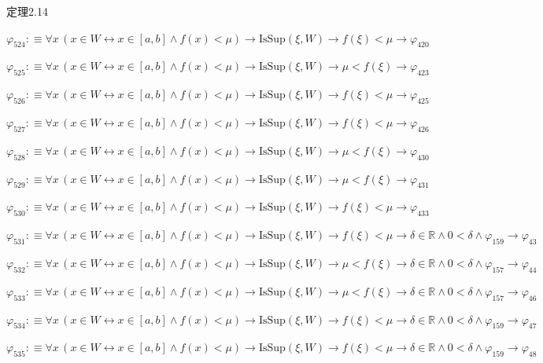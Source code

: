 \begin{fullproof}{定理2.14}
\begin{abbrevlist}
\item $\varphi_{524} :\equiv \forall x\,(x \in W \leftrightarrow x \in [a,b] \land f(x) < \mu) \to \mathrm{IsSup}(\xi,W) \to f(\xi) < \mu \to \varphi_{420}$
\item $\varphi_{525} :\equiv \forall x\,(x \in W \leftrightarrow x \in [a,b] \land f(x) < \mu) \to \mathrm{IsSup}(\xi,W) \to \mu < f(\xi) \to \varphi_{423}$
\item $\varphi_{526} :\equiv \forall x\,(x \in W \leftrightarrow x \in [a,b] \land f(x) < \mu) \to \mathrm{IsSup}(\xi,W) \to f(\xi) < \mu \to \varphi_{425}$
\item $\varphi_{527} :\equiv \forall x\,(x \in W \leftrightarrow x \in [a,b] \land f(x) < \mu) \to \mathrm{IsSup}(\xi,W) \to f(\xi) < \mu \to \varphi_{426}$
\item $\varphi_{528} :\equiv \forall x\,(x \in W \leftrightarrow x \in [a,b] \land f(x) < \mu) \to \mathrm{IsSup}(\xi,W) \to \mu < f(\xi) \to \varphi_{430}$
\item $\varphi_{529} :\equiv \forall x\,(x \in W \leftrightarrow x \in [a,b] \land f(x) < \mu) \to \mathrm{IsSup}(\xi,W) \to \mu < f(\xi) \to \varphi_{431}$
\item $\varphi_{530} :\equiv \forall x\,(x \in W \leftrightarrow x \in [a,b] \land f(x) < \mu) \to \mathrm{IsSup}(\xi,W) \to f(\xi) < \mu \to \varphi_{433}$
\item $\varphi_{531} :\equiv \forall x\,(x \in W \leftrightarrow x \in [a,b] \land f(x) < \mu) \to \mathrm{IsSup}(\xi,W) \to f(\xi) < \mu \to \delta \in \mathbb{R} \land 0 < \delta \land \varphi_{159} \to \varphi_{43}$
\item $\varphi_{532} :\equiv \forall x\,(x \in W \leftrightarrow x \in [a,b] \land f(x) < \mu) \to \mathrm{IsSup}(\xi,W) \to \mu < f(\xi) \to \delta \in \mathbb{R} \land 0 < \delta \land \varphi_{157} \to \varphi_{44}$
\item $\varphi_{533} :\equiv \forall x\,(x \in W \leftrightarrow x \in [a,b] \land f(x) < \mu) \to \mathrm{IsSup}(\xi,W) \to \mu < f(\xi) \to \delta \in \mathbb{R} \land 0 < \delta \land \varphi_{157} \to \varphi_{46}$
\item $\varphi_{534} :\equiv \forall x\,(x \in W \leftrightarrow x \in [a,b] \land f(x) < \mu) \to \mathrm{IsSup}(\xi,W) \to f(\xi) < \mu \to \delta \in \mathbb{R} \land 0 < \delta \land \varphi_{159} \to \varphi_{47}$
\item $\varphi_{535} :\equiv \forall x\,(x \in W \leftrightarrow x \in [a,b] \land f(x) < \mu) \to \mathrm{IsSup}(\xi,W) \to f(\xi) < \mu \to \delta \in \mathbb{R} \land 0 < \delta \land \varphi_{159} \to \varphi_{48}$

\end{abbrevlist}
\end{fullproof}
